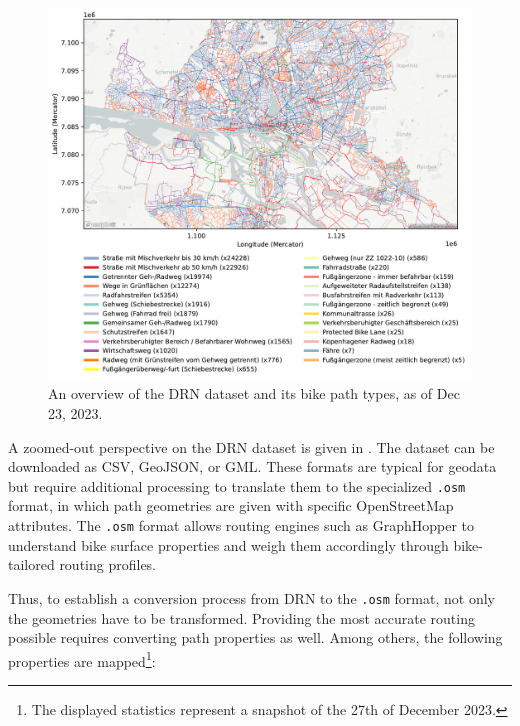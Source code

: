 \begin{figure}[ht]
\centering
\includegraphics[width=\linewidth]{images/routing-drn.pdf}
\caption{An overview of the DRN dataset and its bike path types, as of Dec 23, 2023.}
\label{fig:drn-map}
\end{figure}

A zoomed-out perspective on the DRN dataset is given in . The dataset can be downloaded as CSV, GeoJSON, or GML. These formats are typical for geodata but require additional processing to translate them to the specialized \texttt{.osm} format, in which path geometries are given with specific OpenStreetMap attributes. The \texttt{.osm} format allows routing engines such as GraphHopper to understand bike surface properties and weigh them accordingly through bike-tailored routing profiles.  

Thus, to establish a conversion process from DRN to the \texttt{.osm} format, not only the geometries have to be transformed. Providing the most accurate routing possible requires converting path properties as well. Among others, the following properties are mapped\footnote{The displayed statistics represent a snapshot of the 27th of December 2023.}:

